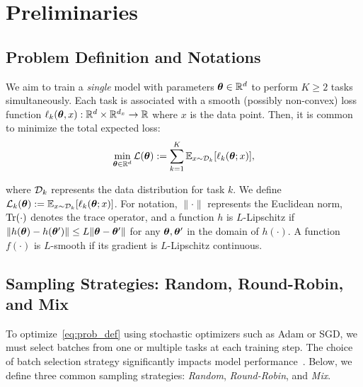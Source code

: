\vspace{-0.4cm}
\section{Preliminaries}\label{sec: preliminary}

\subsection{Problem Definition and Notations} \label{sec:Notations}


We aim to train a \emph{single} model with parameters \(\bm{\theta} \in \mathbb{R}^d\) to perform \(K \geq 2\) tasks simultaneously. Each task is associated with a smooth (possibly non-convex) loss function \(\ell_k(\bm{\theta}, x): \mathbb{R}^d \times \mathbb{R}^{d_x} \to \mathbb{R}\) where $x$ is the data point. Then, it is common to minimize  the total expected loss:
\begin{equation}  \label{eq:prob_def}
\min_{\bm{\theta} \in \mathbb{R}^d} \mathcal{L}(\bm{\theta}) := \sum_{k=1}^{K} \mathbb{E}_{x \sim \mathcal{D}_k} [\ell_k(\bm{\theta}; x)],  
\end{equation}  

where \(\mathcal{D}_k\) represents the data distribution for task \(k\). We define \(\mathcal{L}_k(\bm{\theta}) := \mathbb{E}_{x \sim \mathcal{D}_k} [\ell_k(\bm{\theta}; x)]\).
%
For notation, \(\|\cdot\|\) represents the Euclidean norm, \(\textrm{Tr}(\cdot)\) denotes the trace operator, and a function \(h\) is \(L\)-Lipschitz if \(\|h(\bm{\theta}) - h(\bm{\theta}')\| \leq L \|\bm{\theta} - \bm{\theta}'\|\) for any \(\bm{\theta}, \bm{\theta}'\) in the domain of $h(\cdot)$. A function \(f(\cdot)\) is \(L\)-smooth if its gradient is \(L\)-Lipschitz continuous.






%
%
%
%
%
%

%




\subsection{Sampling Strategies: Random, Round-Robin, and Mix}

To optimize~\eqref{eq:prob_def} using stochastic optimizers such as Adam or SGD, we must select batches from one or multiple tasks at each training step. The choice of batch selection strategy significantly impacts model performance~\citep{bengio2009curriculum, ge2024data, ye2024data, xie2024doremi, liu2024regmix}. Below, we define three common sampling strategies: \textit{Random}, \textit{Round-Robin}, and \textit{Mix}.

